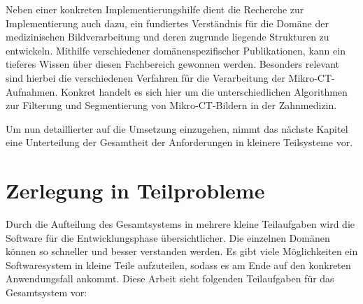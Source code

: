 Neben einer konkreten Implementierungshilfe dient die Recherche zur Implementierung
auch dazu, ein fundiertes Verständnis für die Domäne der medizinischen
Bildverarbeitung und deren zugrunde liegende Strukturen zu entwickeln. Mithilfe verschiedener
domänenspezifischer Publikationen, kann ein tieferes Wissen über diesen
Fachbereich gewonnen werden. Besonders relevant sind hierbei die verschiedenen Verfahren
für die Verarbeitung der Mikro-\ac{CT}-Aufnahmen. Konkret handelt es sich hier um
die unterschiedlichen Algorithmen zur Filterung und Segmentierung von Mikro-\ac{CT}-Bildern
in der Zahnmedizin.

Um nun detaillierter auf die Umsetzung einzugehen, nimmt das nächste Kapitel eine
Unterteilung der Gesamtheit der Anforderungen in kleinere Teilsysteme vor.

\section{Zerlegung in Teilprobleme}
\label{sec_zerlegung_in_teilprobleme} Durch die Aufteilung des Gesamtsystems in mehrere
kleine Teilaufgaben wird die Software für die Entwicklungsphase übersichtlicher.
Die einzelnen Domänen können so schneller und besser verstanden werden. Es gibt viele
Möglichkeiten ein Softwaresystem in kleine Teile aufzuteilen, sodass es am Ende
auf den konkreten Anwendungsfall ankommt. Diese Arbeit sieht folgenden Teilaufgaben
für das Gesamtsystem vor:

